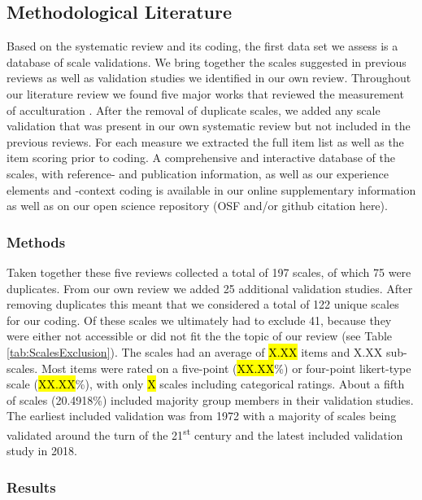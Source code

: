 \subsection{Methodological Literature}

Based on the systematic review and its coding, the first data set we
assess is a database of scale validations. We bring together the scales
suggested in previous reviews as well as validation studies we
identified in our own review. Throughout our literature review we found
five major works that reviewed the measurement of acculturation
\citep{Celenk2011, Maestas2000, Matsudaira2006, Wallace2010, Zane2004}.
After the removal of duplicate scales, we added any scale validation
that was present in our own systematic review but not included in the
previous reviews. For each measure we extracted the full item list as
well as the item scoring prior to coding. A comprehensive and
interactive database of the scales, with reference- and publication
information, as well as our experience elements and -context coding is
available in our online supplementary information as well as on our open
science repository (OSF and/or github citation here).

\subsubsection{Methods}

Taken together these five reviews collected a total of 197 scales, of
which 75 were duplicates. From our own review we added 25 additional
validation studies. After removing duplicates this meant that we
considered a total of 122 unique scales for our coding. Of these scales
we ultimately had to exclude 41, because they were either not accessible
or did not fit the the topic of our review (see Table
\ref{tab:ScalesExclusion}). The scales had an average of \hl{X.XX} items
and X.XX sub-scales. Most items were rated on a five-point
(\hl{XX.XX}\%) or four-point likert-type scale (\hl{XX.XX}\%), with only
\hl{X} scales including categorical ratings. About a fifth of scales
(20.4918\%) included majority group members in their validation studies.
The earliest included validation was from 1972 with a majority of scales
being validated around the turn of the 21\textsuperscript{st} century
and the latest included validation study in 2018.



\subsubsection{Results}


